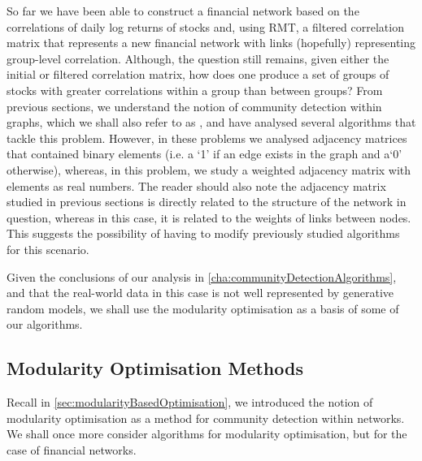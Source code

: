 So far we have been able to construct a financial network based on the correlations of daily log returns of stocks and, using RMT, a filtered correlation matrix that represents a new financial network with links (hopefully) representing group-level correlation.
Although, the question still remains, given either the initial or filtered correlation matrix, how does one produce a set of groups of stocks with greater correlations within a group than between groups?
From previous sections, we understand the notion of community detection within graphs, which we shall also refer to as , and have analysed several algorithms that tackle this problem. However, in these problems we analysed adjacency matrices that contained binary elements (i.e. a `1' if an edge exists in the graph and a`0' otherwise), whereas, in this problem, we study a weighted adjacency matrix with elements as real numbers.
The reader should also note the adjacency matrix studied in previous sections is directly related to the structure of the network in question, whereas in this case, it is related to the weights of links between nodes.
This suggests the possibility of having to modify previously studied algorithms for this scenario.

Given the conclusions of our analysis in \cref{cha:communityDetectionAlgorithms}, and that the real-world data in this case is not well represented by generative random models, we shall use the modularity optimisation as a basis of some of our algorithms.


\subsection{Modularity Optimisation Methods}
\label{subsec:modularityOptimisationMethods}

Recall in \cref{sec:modularityBasedOptimisation}, we introduced the notion of modularity optimisation as a method for community detection within networks. We shall once more consider algorithms for modularity optimisation, but for the case of financial networks.

